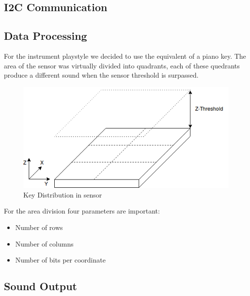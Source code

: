 \documentclass{article}
\begin{document}
\subsection{I2C Communication}

\newpage

\subsection{Data Processing}

\noindent For the instrument playstyle we decided to use the equivalent of a piano key. The area of the sensor was virtually divided into quadrants, each of these quedrants produce a different sound when the sensor threshold is surpassed. 

\begin{figure}[h]
\centering
\includegraphics[width=12cm]{SensorKeys.png}
\caption{Key Distribution in sensor}
\end{figure}

\noindent For the area division four parameters are important: 
\begin{itemize}
\item Number of rows
\item Number of columns
\item Number of bits per coordinate
\end{itemize}

\noindent 

\subsection{Sound Output}
\end{document}
